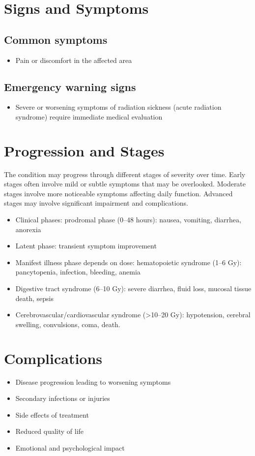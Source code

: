 \section{Signs and Symptoms}

\subsection{Common symptoms}
\begin{itemize}[noitemsep]
  \item Pain or discomfort in the affected area
  \end{itemize}

\subsection{Emergency warning signs}
\begin{itemize}[noitemsep]
  \item Severe or worsening symptoms of radiation sickness (acute radiation syndrome) require immediate medical evaluation
\end{itemize}
\section{Progression and Stages}
The condition may progress through different stages of severity over time. Early stages often involve mild or subtle symptoms that may be overlooked. Moderate stages involve more noticeable symptoms affecting daily function. Advanced stages may involve significant impairment and complications.

\begin{itemize}[noitemsep]
  \item Clinical phases: prodromal phase (0--48 hours): nausea, vomiting, diarrhea, anorexia
  \item Latent phase: transient symptom improvement
  \item Manifest illness phase depends on dose: hematopoietic syndrome (1--6 Gy): pancytopenia, infection, bleeding, anemia
  \item Digestive tract syndrome (6--10 Gy): severe diarrhea, fluid loss, mucosal tissue death, sepsis
  \item Cerebrovascular/cardiovascular syndrome (>10--20 Gy): hypotension, cerebral swelling, convulsions, coma, death.
\end{itemize}
\section{Complications}
\begin{itemize}[noitemsep]
  \item Disease progression leading to worsening symptoms
  \item Secondary infections or injuries
  \item Side effects of treatment
  \item Reduced quality of life
  \item Emotional and psychological impact
\end{itemize}
